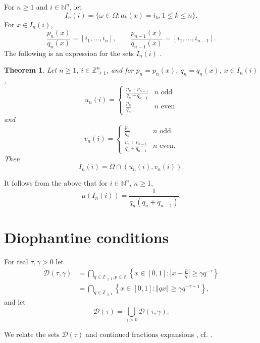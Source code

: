 \documentclass{article}
\newcommand{\norm}[1]{\left\Vert #1 \right\Vert}
\newtheorem{theorem}{Theorem}
\begin{document}
For $n \geq 1$ and $i \in \mathbb{N}^n$, 
let 
\[
I_n(i) = \{\omega \in \Omega: a_k(x) = i_k, 1 \leq k \leq n\}.
\]
For $x \in I_n(i)$, 
\[
\frac{p_n(x)}{q_n(x)} = [i_1,\ldots,i_n],
\qquad \frac{p_{n-1}(x)}{q_{n-1}(x)} = [i_1,\ldots,i_{n-1}].
\]
The following is an expression for the sets $I_n(i)$ \cite[p.~18, Theorem 1.2.2]{iosifescu}.

\begin{theorem}
Let $n \geq 1$, $i \in \mathbb{Z}_{\geq 1}^n$,
and for $p_n=p_n(x)$, $q_n=q_n(x)$, $x \in I_n(i)$,
\[
u_n(i) = \begin{cases}
\frac{p_n+p_{n-1}}{q_n+q_{n-1}}&\textrm{$n$ odd}\\
\frac{p_n}{q_n}&\textrm{$n$ even}
\end{cases}
\]
and
\[
v_n(i) = \begin{cases}
\frac{p_n}{q_n}&\textrm{$n$ odd}\\
\frac{p_n+p_{n-1}}{q_n+q_{n-1}}&\textrm{$n$ even}.
\end{cases}
\]
Then
\[
I_n(i) = \Omega \cap (u_n(i),v_n(i)).
\]
\end{theorem}

It follows from the above that for $i \in \mathbb{N}^n$, $n \geq 1$,
\[
\mu(I_n(i)) = \frac{1}{q_n(q_n+q_{n-1})}.
\]





\section{Diophantine conditions}
For real $\tau,\gamma>0$ let
\begin{align*}
\mathcal{D}(\tau,\gamma) &=\bigcap_{q \in \mathbb{Z}_{\geq 1}, p \in \mathbb{Z}} \left\{x \in [0,1]: \left|x-\frac{p}{q}\right| \geq \gamma q^{-\tau} \right\}\\
&=\bigcap_{q \in \mathbb{Z}_{\geq 1}} \left\{x \in [0,1]: \norm{qx} \geq \gamma q^{-\tau+1} \right\},
\end{align*}
and let
\[
\mathcal{D}(\tau) = \bigcup_{\gamma>0} \mathcal{D}(\tau,\gamma).
\]

We relate the sets $\mathcal{D}(\tau)$ and continued fractions expansions  \cite[p.~241, Lemma C.6]{milnor}, cf.  \cite[p.~130, Proposition 2.4]{yoccoz}.
\end{document}
